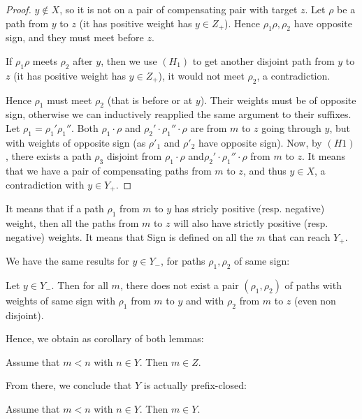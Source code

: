 \begin{proof}
  $y \notin X$, so it is not on a pair of compensating pair with target $z$.
  Let $\rho$ be a path from $y$ to $z$ (it has positive weight has $y \in Z_+$).
  Hence $\rho_1 \rho, \rho_2$ have opposite sign, and they must meet before $z$.

  If $\rho_1 \rho$ meets $\rho_2$ after $y$, then we use $(H_1)$ to get another disjoint path from $y$ to $z$ (it has positive weight has $y \in Z_+$), it would not meet $\rho_2$, a contradiction.

  Hence $\rho_1$ must meet $\rho_2$ (that is before or at $y$).
  Their weights must be of opposite sign, otherwise we can inductively reapplied the same argument to their suffixes.
  Let $\rho_1=\rho_1'\rho_1''$.
  Both $\rho_1 \cdot \rho$ and $\rho_2' \cdot \rho_1'' \cdot \rho$
  are from $m$ to $z$ going through $y$, but with weights of opposite sign (as $\rho'_1$ and $\rho'_2$ have opposite sign).
  Now, by $(H1)$, there exists a path $\rho_3$ disjoint from $\rho_1 \cdot \rho$ and$\rho_2' \cdot \rho_1'' \cdot \rho$ from $m$ to $z$. It means that we have a pair of compensating paths from $m$ to $z$, and thus $y \in X$, a contradiction with $y \in Y_+$. 
\end{proof}

It means that if a path $\rho_1$ from $m$ to $y$ has stricly positive (resp. negative) weight, then all the paths from $m$ to $z$ will also have strictly positive (resp. negative) weights. It means that Sign is defined on all the $m$ that can reach $Y_+$.

We have the same results for $y \in Y_-$, for paths $\rho_1, \rho_2$ of same sign:

\begin{lemma}
	\label{lemma11}
	Let $y \in Y_-$. Then for all $m$, there does not exist a pair $(\rho_1,\rho_2)$ 
	of paths with weights of same sign with $\rho_1$ from $m$ to $y$ and 
	with $\rho_2$ from $m$ to $z$ (even non disjoint).
\end{lemma}

Hence, we obtain as corollary of both lemmas:

\begin{corollary}
\label{cor:simple}
Assume that $m < n$ with $n \in Y$.
Then $m \in Z$.
\end{corollary}

From there, we conclude that $Y$ is actually prefix-closed:

\begin{lemma}
	\label{lemma12}
	Assume that $m < n$ with $n \in Y$.
	Then $m \in Y$.
\end{lemma}

